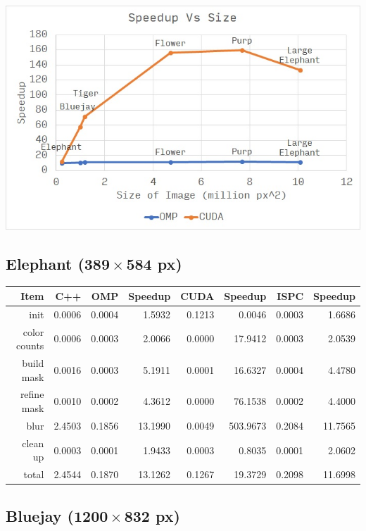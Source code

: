 \documentclass[12pt]{article}
\begin{document}
\begin{center}
\includegraphics[scale=1]{speedup.jpg}
\end{center}

\subsection{Elephant ($\mathbf{389 \times 584}$ px)}

\begin{tabular}{r|r|r|r|r|r|r|r}
    Item & C++ & OMP & Speedup & CUDA & Speedup & ISPC & Speedup
\\  \hline
    init & 0.0006 & 0.0004 & 1.5932 & 0.1213 & 0.0046 & 0.0003 & 1.6686
\\  color counts & 0.0006 & 0.0003 & 2.0066 & 0.0000 & 17.9412 & 0.0003 & 2.0539
\\  build mask & 0.0016 & 0.0003 & 5.1911 & 0.0001 & 16.6327 & 0.0004 & 4.4780
\\  refine mask & 0.0010 & 0.0002 & 4.3612 & 0.0000 & 76.1538 & 0.0002 & 4.4000
\\  blur & 2.4503 & 0.1856 & 13.1990 & 0.0049 & 503.9673 & 0.2084 & 11.7565
\\  clean up & 0.0003 & 0.0001 & 1.9433 & 0.0003 & 0.8035 & 0.0001 & 2.0602
\\  \hline
    total & 2.4544 & 0.1870 & 13.1262 & 0.1267 & 19.3729 & 0.2098 & 11.6998
\end{tabular}

\subsection{Bluejay ($\mathbf{1200 \times 832}$ px)}
\end{document}
